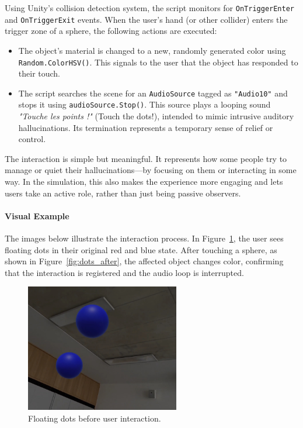 Using Unity's collision detection system, the script monitors for \texttt{OnTriggerEnter} and \texttt{OnTriggerExit} events. When the user's hand (or other collider) enters the trigger zone of a sphere, the following actions are executed:

\begin{itemize}
    \item The object's material is changed to a new, randomly generated color using \texttt{Random.ColorHSV()}. This signals to the user that the object has responded to their touch.
    \item The script searches the scene for an \texttt{AudioSource} tagged as \texttt{"Audio10"} and stops it using \texttt{audioSource.Stop()}. This source plays a looping sound \textit{"Touche les points !"} (Touch the dots!), intended to mimic intrusive auditory hallucinations. Its termination represents a temporary sense of relief or control.
\end{itemize}

The interaction is simple but meaningful. It represents how some people try to manage or quiet their hallucinations—by focusing on them or interacting in some way. In the simulation, this also makes the experience more engaging and lets users take an active role, rather than just being passive observers.

\paragraph{Visual Example}
The images below illustrate the interaction process. In Figure~\ref{fig:dots_before}, the user sees floating dots in their original red and blue state. After touching a sphere, as shown in Figure~\ref{fig:dots_after}, the affected object changes color, confirming that the interaction is registered and the audio loop is interrupted.

\begin{figure}[H]
    \centering
    \includegraphics[width=0.6\textwidth]{../../Figures/dots-video.jpg}
    \caption{Floating dots before user interaction.}
    \label{fig:dots_before}
\end{figure}

